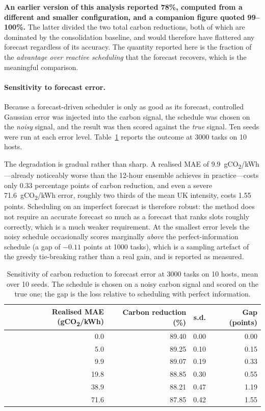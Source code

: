 \documentclass[12pt,a4paper]{article}
\begin{document}
\textbf{An earlier version of this analysis reported 78\%, computed from a different and smaller
configuration, and a companion figure quoted 99--100\%.} The latter divided the two total carbon reductions,
both of which are dominated by the consolidation baseline, and would therefore have flattered any forecast
regardless of its accuracy. The quantity reported here is the fraction of the \emph{advantage over reactive
scheduling} that the forecast recovers, which is the meaningful comparison.

\paragraph{Sensitivity to forecast error.} Because a forecast-driven scheduler is only as good as its
forecast, controlled Gaussian error was injected into the carbon signal, the schedule was chosen on the
\emph{noisy} signal, and the result was then scored against the \emph{true} signal. Ten seeds were run at each
error level. Table~\ref{tab:degrade} reports the outcome at 3000 tasks on 10 hosts.

The degradation is gradual rather than sharp. A realised MAE of 9.9~gCO\textsubscript{2}/kWh---already
noticeably worse than the 12-hour ensemble achieves in practice---costs only 0.33 percentage points of carbon
reduction, and even a severe 71.6~gCO\textsubscript{2}/kWh error, roughly two thirds of the mean UK intensity,
costs 1.55 points. Scheduling on an imperfect forecast is therefore robust: the method does not require an
accurate forecast so much as a forecast that ranks slots roughly correctly, which is a much weaker
requirement. At the smallest error levels the noisy schedule occasionally scores marginally \emph{above} the
perfect-information schedule (a gap of $-0.11$ points at 1000 tasks), which is a sampling artefact of the
greedy tie-breaking rather than a real gain, and is reported as measured.

\begin{table}[H]\centering\small
\caption{Sensitivity of carbon reduction to forecast error at 3000 tasks on 10 hosts, mean over 10 seeds. The
schedule is chosen on a noisy carbon signal and scored on the true one; the gap is the loss relative to
scheduling with perfect information.}\label{tab:degrade}
\begin{tabular}{rrrr}
\toprule
Realised MAE (gCO\textsubscript{2}/kWh) & Carbon reduction (\%) & s.d. & Gap (points) \\
\midrule
0.0  & 89.40 & 0.00 & 0.00 \\
5.0  & 89.25 & 0.10 & 0.15 \\
9.9  & 89.07 & 0.19 & 0.33 \\
19.8 & 88.85 & 0.30 & 0.55 \\
38.9 & 88.21 & 0.47 & 1.19 \\
71.6 & 87.85 & 0.42 & 1.55 \\
\bottomrule
\end{tabular}
\end{table}
\end{document}

